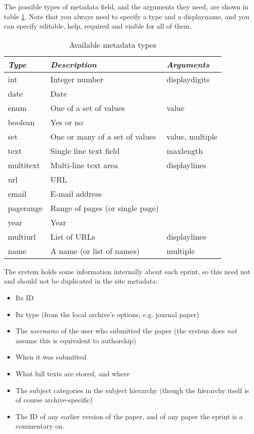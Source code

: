 {The possible types of metadata field, and the arguments they need, are shown in table \ref{install_meta_types}. Note that you always need to specify a type and a displayname, and you can specify editable, help, required and visible for all of them.

\begin{table}
\begin{center}
\begin{tabular}{|l|l|l|}
\hline
\emph{Type} & \emph{Description}              & \emph{Arguments} \\
\hline
int         & Integer number                  & displaydigits    \\
date        & Date                            &                  \\
enum        & One of a set of values          & value            \\
boolean     & Yes or no                       &                  \\
set         & One or many of a set of values  & value, multiple  \\
text        & Single line text field          & maxlength        \\
multitext   & Multi-line text area            & displaylines     \\
url         & URL                             &                  \\
email       & E-mail address                  &                  \\
pagerange   & Range of pages (or single page) &                  \\
year        & Year                            &                  \\
multiurl    & List of URLs                    & displaylines     \\
name        & A name (or list of names)       & multiple         \\
\hline
\end{tabular}
\caption{\label{install_meta_types} Available metadata types}
\end{center}
\end{table}

The system holds some information internally about each eprint, so this need not and should not be duplicated in the site metadata:

\begin{itemize}
\item Its ID
\item Its type (from the local archive's options, e.g. journal paper)
\item The \emph{username} of the user who submitted the paper (the system does \emph{not} assume this is equivalent to authorship)
\item When it was submitted
\item What full texts are stored, and where
\item The subject categories in the subject hierarchy (though the hierarchy itself is of course archive-specific)
\item The ID of any earlier version of the paper, and of any paper the eprint is a commentary on.
\end{itemize}

}
